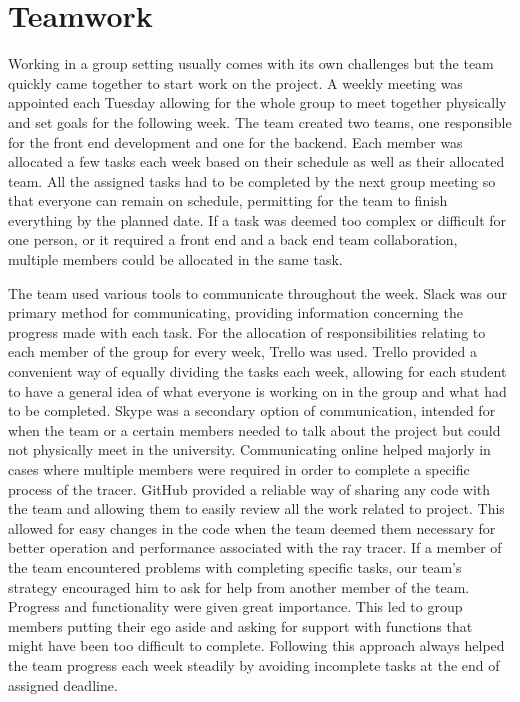 \documentclass[10pt]{scrartcl}
\begin{document}
\section{Teamwork}
Working in a group setting usually comes with its own challenges but the team quickly came together to start work on the project. A weekly meeting was appointed each Tuesday allowing for the whole group to meet together physically and set goals for the following week. The team created two teams, one responsible for the front end development and one for the backend. Each member was allocated a few tasks each week based on their schedule as well as their allocated team. All the assigned tasks had to be completed by the next group meeting so that everyone can remain on schedule, permitting for the team to finish everything by the planned date. If a task was deemed too complex or difficult for one person, or it required a front end and a back end team collaboration, multiple members could be allocated in the same task. \par
The team used various tools to communicate throughout the week. Slack was our primary method for communicating, providing information concerning the progress made with each task. For the allocation of responsibilities relating to each member of the group for every week, Trello was used. Trello provided a convenient way of equally dividing the tasks each week, allowing for each student to have a general idea of what everyone is working on in the group and what had to be completed. Skype was a secondary option of communication, intended for when the team or a certain members needed to talk about the project but could not physically meet in the university. Communicating online helped majorly in cases where multiple members were required in order to complete a specific process of the tracer. GitHub provided a reliable way of sharing any code with the team and allowing them to easily review all the work related to project. This allowed for easy changes in the code when the team deemed them necessary for better operation and performance associated with the ray tracer.
If a member of the team encountered problems with completing specific tasks, our team’s strategy encouraged him to ask for help from another member of the team. Progress and functionality were given great importance. This led to group members putting their ego aside and asking for support with functions that might have been too difficult to complete. Following this approach always helped the team progress each week steadily by avoiding incomplete tasks at the end of assigned deadline. \par
\end{document}
